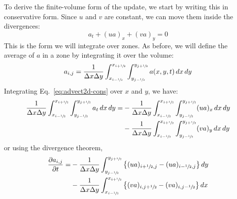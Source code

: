 To derive the finite-volume form of the update, we start by writing
this in conservative form.  Since $u$ and $v$ are constant, we can
move them inside the divergences:
\begin{equation}
a_t + (u a)_x + (v a)_y = 0
\label{eq:advect2d-cons}
\end{equation}
This is the form we will integrate over zones.  As before, we will
define the average of $a$ in a zone by integrating it over the
volume:
\begin{equation}
a_{i,j} = \frac{1}{\Delta x \Delta y} 
   \int_{x_{i-\sfrac{1}{2}}}^{x_{i+\sfrac{1}{2}}} \int_{y_{j-\sfrac{1}{2}}}^{y_{j+\sfrac{1}{2}}} 
   a(x,y,t) \, dx \, dy
\end{equation}
Integrating Eq.~\ref{eq:advect2d-cons} over $x$ and $y$, we have:
\begin{align}
\frac{1}{\Delta x \Delta y} 
  \int_{x_{i-\sfrac{1}{2}}}^{x_{i+\sfrac{1}{2}}} 
  \int_{y_{j-\sfrac{1}{2}}}^{y_{j+\sfrac{1}{2}}} a_t \, dx \, dy =  
  &- \frac{1}{\Delta x \Delta y}
       \int_{x_{i-\sfrac{1}{2}}}^{x_{i+\sfrac{1}{2}}} \int_{y_{j-\sfrac{1}{2}}}^{y_{j+\sfrac{1}{2}}}
      (u a)_x \, dx \, dy \nonumber \\
  &- \frac{1}{\Delta x \Delta y}
       \int_{x_{i-\sfrac{1}{2}}}^{x_{i+\sfrac{1}{2}}} \int_{y_{j-\sfrac{1}{2}}}^{y_{j+\sfrac{1}{2}}}
      (v a)_y \, dx \, dy 
\end{align}
or using the divergence theorem,
\begin{align}
 \frac{\partial a_{i,j}}{\partial t} =
  &- \frac{1}{\Delta x\Delta y} \int_{y_{j-\sfrac{1}{2}}}^{y_{j+\sfrac{1}{2}}}
     \left \{ (u a)_{i+\sfrac{1}{2},j} - (u a)_{i-\sfrac{1}{2},j} \right \} dy \nonumber \\
  &- \frac{1}{\Delta x\Delta y} \int_{x_{i-\sfrac{1}{2}}}^{x_{i+\sfrac{1}{2}}}
     \left \{ (v a)_{i,j+\sfrac{1}{2}} - (v a)_{i,j-\sfrac{1}{2}} \right \} dx
\end{align}

